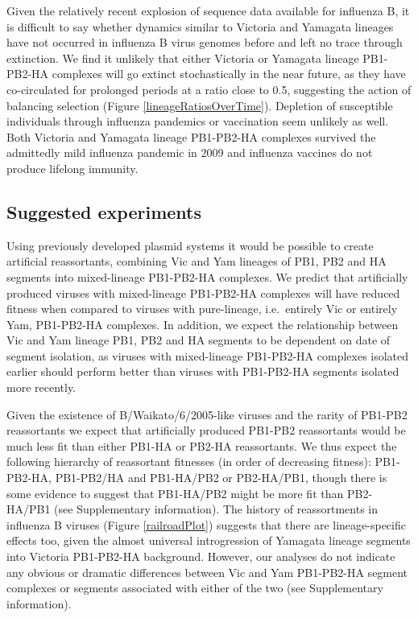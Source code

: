 \documentclass[11pt,oneside,letterpaper]{article}
\begin{document}
Given the relatively recent explosion of sequence data available for influenza B, it is difficult to say whether dynamics similar to Victoria and Yamagata lineages have not occurred in influenza B virus genomes before and left no trace through extinction.
We find it unlikely that either Victoria or Yamagata lineage PB1-PB2-HA complexes will go extinct stochastically in the near future, as they have co-circulated for prolonged periods at a ratio close to 0.5, suggesting the action of balancing selection (Figure \ref{lineageRatiosOverTime}).
Depletion of susceptible individuals through influenza pandemics or vaccination seem unlikely as well.
Both Victoria and Yamagata lineage PB1-PB2-HA complexes survived the admittedly mild influenza pandemic in 2009 and influenza vaccines do not produce lifelong immunity.

\subsection*{Suggested experiments}
Using previously developed plasmid systems \cite{hoffmann2002} it would be possible to create artificial reassortants, combining Vic and Yam lineages of PB1, PB2 and HA segments into mixed-lineage PB1-PB2-HA complexes.
We predict that artificially produced viruses with mixed-lineage PB1-PB2-HA complexes will have reduced fitness when compared to viruses with pure-lineage, i.e.\ entirely Vic or entirely Yam, PB1-PB2-HA complexes.
In addition, we expect the relationship between Vic and Yam lineage PB1, PB2 and HA segments to be dependent on date of segment isolation, as viruses with mixed-lineage PB1-PB2-HA complexes isolated earlier should perform better than viruses with PB1-PB2-HA segments isolated more recently.

Given the existence of B/Waikato/6/2005-like viruses and the rarity of PB1-PB2 reassortants we expect that artificially produced PB1-PB2 reassortants would be much less fit than either PB1-HA or PB2-HA reassortants.
We thus expect the following hierarchy of reassortant fitnesses (in order of decreasing fitness): PB1-PB2-HA, PB1-PB2/HA and PB1-HA/PB2 or PB2-HA/PB1, though there is some evidence to suggest that PB1-HA/PB2 might be more fit than PB2-HA/PB1 (see Supplementary information).
The history of reassortments in influenza B viruses (Figure \ref{railroadPlot}) suggests that there are lineage-specific effects too, given the almost universal introgression of Yamagata lineage segments into Victoria PB1-PB2-HA background.
However, our analyses do not indicate any obvious or dramatic differences between Vic and Yam PB1-PB2-HA segment complexes or segments associated with either of the two (see Supplementary information).
\end{document}
